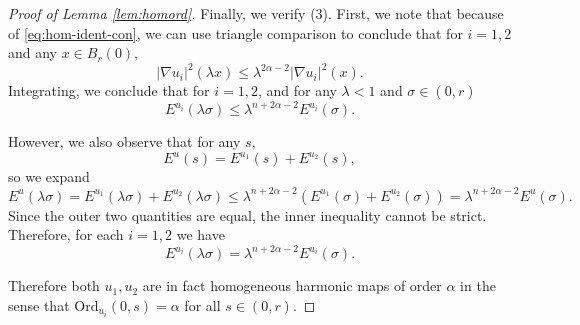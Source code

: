 \documentclass[12pt]{amsart}
\theoremstyle{definition}
\numberwithin{equation}{section}
\begin{document}
\begin{proof}[Proof of Lemma \ref{lem:homord}]
Finally, we verify (3).  First, we note that because of \eqref{eq:hom-ident-con}, we can use triangle comparison to conclude that for $i=1,2$ and any $x\in B_r(0)$,
\[
|\nabla u_i|^2(\lambda x)\leq \lambda^{2\alpha-2}|\nabla u_i|^2(x).
\]
Integrating, we conclude that for $i=1,2$, and for any $\lambda<1$ and $\sigma\in(0,r)$
\begin{equation}\label{eq:hom-en-ineq}
E^{u_i}(\lambda\sigma)\leq\lambda^{n+2\alpha-2}E^{u_i}(\sigma).
\end{equation}

However, we also observe that for any $s$,
\[
E^u(s)=E^{u_1}(s)+E^{u_2}(s),
\]
so we expand
\[
E^u(\lambda\sigma)=E^{u_1}(\lambda\sigma)+E^{u_2}(\lambda\sigma)\leq\lambda^{n+2\alpha-2}(E^{u_1}(\sigma)+E^{u_2}(\sigma))=\lambda^{n+2\alpha-2}E^u(\sigma).
\]
Since the outer two quantities are equal, the inner inequality cannot be strict.  Therefore, for each $i=1,2$ we have
\[
E^{u_i}(\lambda\sigma)=\lambda^{n+2\alpha-2}E^{u_i}(\sigma).
\]

Therefore both $u_1,u_2$ are in fact homogeneous harmonic maps of order $\alpha$ in the sense that $\text{Ord}_{u_i}(0,s)=\alpha$ for all $s\in(0,r)$.
\end{proof}
\end{document}

